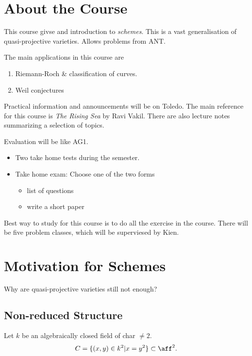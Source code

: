 \setcounter{chapter}{-1}
\chapter{About the Course} \label{chap:about_the_course}

This course givse and introduction to \emph{schemes}. This is a vast generalisation of quasi-projective varieties. Allows problems from ANT.

The main applications in this course are 
\begin{enumerate}
	\item Riemann-Roch \& classification of curves.
	\item Weil conjectures 
\end{enumerate}

Practical information and announcements will be on Toledo. The main reference for this course is \emph{The Rising Sea} by Ravi Vakil.
There are also lecture notes summarizing a selection of topics.

Evaluation will be like AG1. 
\begin{itemize}
	\item Two take home tests during the semester. 
	\item Take home exam: Choose one of the two forms
		\begin{itemize}
			\item list of questions
			\item write a short paper
		\end{itemize}
\end{itemize}

Best way to study for this course is to do all the exercise in the course. 
There will be five problem classes, which will be superviesed by Kien.

\chapter{Motivation for Schemes} \label{chap:motivation_for_schemes}
Why are quasi-projective varieties still not enough?
\section{Non-reduced Structure} \label{sec:reduces_structure}

		Let $k$ be an algebraically closed field of char $\ne 2$.
		 \[
			 C = \{(x,y) \in k^2 | x = y^2\} \subset \aff^2
		.\] 

